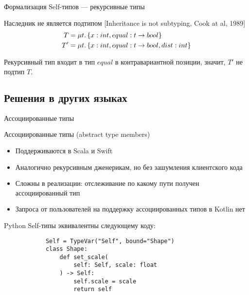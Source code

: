 \documentclass[aspectratio=169,usenames,dvipsnames]{beamer}
\begin{document}
\begin{frame}[fragile]{Формализация Self-типов --- рекурсивные типы}
        \begin{block}{Наследник не является подтипом [Inheritance is not subtyping, Cook at al, 1989]}
            \vspace{-1em}
            \begin{align*}
                T &= \mu t \ldotp \{ x : int, equal : t \to bool \} \\
                T' &= \mu t \ldotp \{ x : int, equal : t \to bool, dist : int \}
            \end{align*}

            Рекурсивный тип входит в тип $equal$ в контравариантной позиции, значит, $T'$ не подтип $T$.
        \end{block}
    \end{frame}


    \subsection{Решения в других языках}

    \begin{frame}{Ассоциированные типы}
        \begin{block}{Ассоциированные типы (abstract type members)}
            \begin{itemize}
                \item Поддерживаются в Scala и Swift
                \item Аналогично рекурсивным дженерикам, но без зашумления клиентского кода
                \item Сложны в реализации: отслеживание по какому пути получен ассоциированный тип
                \item Запроса от пользователей на поддержку ассоциированных типов в Kotlin нет
            \end{itemize}
        \end{block}
    \end{frame}

    \begin{frame}[fragile]{Python}
        Self-типы эквивалентны следующему коду:
        \begin{verbatim}
            Self = TypeVar("Self", bound="Shape")
            class Shape:
                def set_scale(
                    self: Self, scale: float
                ) -> Self:
                    self.scale = scale
                    return self
        \end{verbatim}
    \end{frame}
\end{document}
